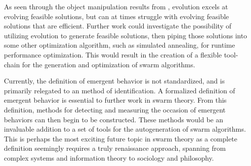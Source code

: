 As seen through the object manipulation results from , evolution excels at evolving feasible solutions, but can at times struggle with evolving feasible solutions that are efficient.  Further work could investigate the possibility of utilizing evolution to generate feasible solutions, then piping those solutions into some other optimization algorithm, such as simulated annealing, for runtime performance optimization.  This would result in the creation of a flexible tool-chain for the generation and optimization of swarm algorithms.

Currently, the definition of emergent behavior is not standardized, and is primarily relegated to an  method of identification.  A formalized definition of emergent behavior is essential to further work in swarm theory.  From this definition, methods for detecting and measuring the occasion of emergent behaviors can then begin to be constructed.  These methods would be an invaluable addition to a set of tools for the autogeneration of swarm algorithms.  This is perhaps the most exciting future topic in swarm theory as a complete definition seemingly requires a truly renaissance approach, spanning from complex systems and information theory to sociology and philosophy.
